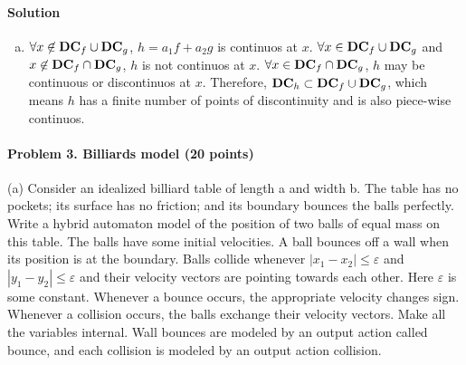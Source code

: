 \documentclass[11pt]{article}
\begin{document}
\paragraph{Solution}
\begin{enumerate}[(a)]
\item
$\forall x \not\in {\bf DC}_f \cup {\bf DC}_g$, $h = a_1  f + a_2 g$ is continuos at $x$. $\forall x \in {\bf DC}_f \cup {\bf DC}_g$ and $x \not\in {\bf DC}_f \cap {\bf DC}_g$, $h$ is not continuos at $x$. $\forall x \in {\bf DC}_f \cap {\bf DC}_g$, $h$ may be continuous or discontinuos at $x$. Therefore, ${\bf DC}_h \subset {\bf DC}_f \cup {\bf DC}_g$, which means $h$ has a finite number of points of discontinuity and is also piece-wise continuos.
\end{enumerate}

\paragraph{Problem 3. Billiards model (20 points)}
(a) Consider an idealized billiard table of length a and width b. The table has no pockets; its surface has no friction; and its boundary bounces the balls perfectly. Write a hybrid automaton model of the position of two balls of equal mass on this table. The balls have some initial velocities. A ball bounces off a wall when its position is at the boundary. Balls collide whenever $|x_1-x_2|\leq\varepsilon$ and $|y_1-y_2| \leq \varepsilon$ and their velocity vectors are pointing towards each other. Here $\varepsilon$ is some constant. Whenever a bounce occurs, the appropriate velocity changes sign. Whenever a collision occurs, the balls exchange their velocity vectors. Make all the variables internal. Wall bounces are modeled by an output action called bounce, and each collision is modeled by an output action collision.
\end{document}
